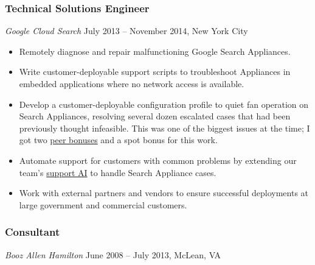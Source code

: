 \documentclass[]{rss}
\begin{document}
\begin{resume}
\subsubsection{Technical Solutions
Engineer}\label{technical-solutions-engineer}

\emph{Google Cloud Search} July 2013 -- November 2014, New York City

\begin{itemize}
\item
  Remotely diagnose and repair malfunctioning Google Search Appliances.
\item
  Write customer-deployable support scripts to troubleshoot Appliances
  in embedded applications where no network access is available.
\item
  Develop a customer-deployable configuration profile to quiet fan
  operation on Search Appliances, resolving several dozen escalated
  cases that had been previously thought infeasible. This was one of the
  biggest issues at the time; I got two
  \href{https://www.quora.com/What-are-peer-bonuses-at-Google-How-do-they-work}{peer
  bonuses} and a spot bonus for this work.
\item
  Automate support for customers with common problems by extending our
  team's \href{https://www.youtube.com/watch?v=bFHk2wUaCCs}{support AI}
  to handle Search Appliance cases.
\item
  Work with external partners and vendors to ensure successful
  deployments at large government and commercial customers.
\end{itemize}

\subsubsection{Consultant}\label{consultant}

\emph{Booz Allen Hamilton} June 2008 -- July 2013, McLean, VA


\end{resume}
\end{document}
